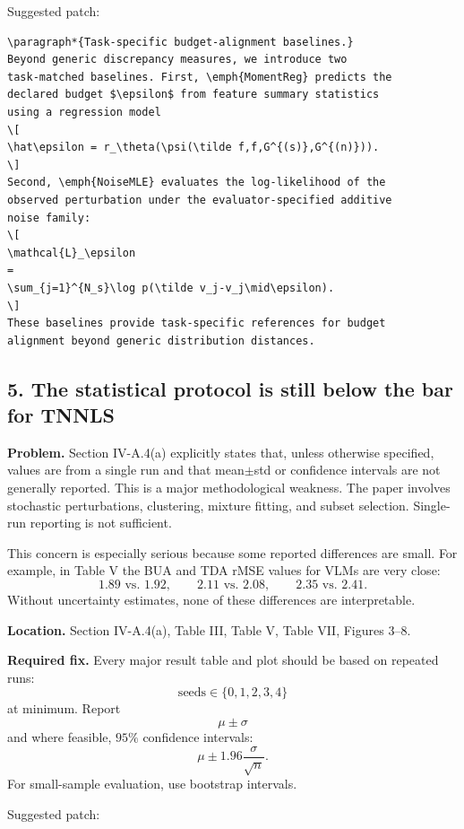 Suggested patch:

\begin{verbatim}
\paragraph*{Task-specific budget-alignment baselines.}
Beyond generic discrepancy measures, we introduce two
task-matched baselines. First, \emph{MomentReg} predicts the
declared budget $\epsilon$ from feature summary statistics
using a regression model
\[
\hat\epsilon = r_\theta(\psi(\tilde f,f,G^{(s)},G^{(n)})).
\]
Second, \emph{NoiseMLE} evaluates the log-likelihood of the
observed perturbation under the evaluator-specified additive
noise family:
\[
\mathcal{L}_\epsilon
=
\sum_{j=1}^{N_s}\log p(\tilde v_j-v_j\mid\epsilon).
\]
These baselines provide task-specific references for budget
alignment beyond generic distribution distances.
\end{verbatim}

\subsection*{5. The statistical protocol is still below the bar for TNNLS}

\textbf{Problem.}  
Section IV-A.4(a) explicitly states that, unless otherwise specified, values are from a single run and that mean$\pm$std or confidence intervals are not generally reported. This is a major methodological weakness. The paper involves stochastic perturbations, clustering, mixture fitting, and subset selection. Single-run reporting is not sufficient.

This concern is especially serious because some reported differences are small. For example, in Table V the BUA and TDA rMSE values for VLMs are very close:
\[
1.89 \text{ vs. } 1.92,\qquad
2.11 \text{ vs. } 2.08,\qquad
2.35 \text{ vs. } 2.41.
\]
Without uncertainty estimates, none of these differences are interpretable.

\textbf{Location.}  
Section IV-A.4(a), Table III, Table V, Table VII, Figures 3--8.

\textbf{Required fix.}  
Every major result table and plot should be based on repeated runs:
\[
\text{seeds} \in \{0,1,2,3,4\}
\]
at minimum. Report
\[
\mu \pm \sigma
\]
and where feasible, $95\%$ confidence intervals:
\[
\mu \pm 1.96 \frac{\sigma}{\sqrt{n}}.
\]
For small-sample evaluation, use bootstrap intervals.

Suggested patch:

